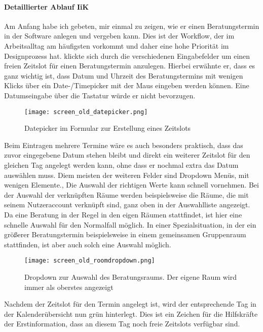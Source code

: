 \paragraph{Detaillierter Ablauf IiK}
Am Anfang habe ich \ipName gebeten, mir einmal zu zeigen, wie er einen
Beratungstermin in der Software anlegen und vergeben kann. Dies ist der
Workflow, der im Arbeitsalltag am häufigsten vorkommt und daher eine hohe
Priorität im Designprozess hat. \ipName klickte sich durch die verschiedenen
Eingabefelder um einen freien Zeitslot für einen Beratungstermin anzulegen.
Hierbei erwähnte er, dass es ganz wichtig ist, dass Datum und Uhrzeit des
Beratungstermins mit wenigen Klicks über ein Date-/Timepicker mit der Maus
eingeben werden können. Eine Datumseingabe über die Tastatur würde er nicht
bevorzugen.

\begin{figure}[H]
    \caption{Datepicker im Formular zur Erstellung eines Zeitslots}
    \centering
    \texttt{[image: screen\_old\_datepicker.png]}
\end{figure}

Beim Eintragen mehrere Termine wäre es auch besonders praktisch, dass das zuvor
eingegebene Datum stehen bleibt und direkt ein weiterer Zeitslot für den
gleichen Tag angelegt werden kann, ohne dass er nochmal extra das Datum
auswählen muss. Diem meisten der weiteren Felder sind Dropdown Menüs, mit
wenigen Elemente., Die Auswahl der richtigen Werte kann \ipName schnell
vornehmen. Bei der Auswahl der verknüpften Räume werden beispielsweise die
Räume, die mit seinem Nutzeraccount verknüpft sind, ganz oben in der
Auswahlliste angezeigt. Da eine Beratung in der Regel in den eigen Räumen
stattfindet, ist hier eine schnelle Auswahl für den Normalfall möglich. In
einer Spezialsituation, in der ein größerer Beratungstermin beispielsweise in
einem gemeinsamen Gruppenraum stattfinden, ist aber auch solch eine Auswahl
möglich.

\begin{figure}[H]
    \caption{Dropdown zur Auswahl des Beratungsraums. Der eigene Raum wird immer als oberstes angezeigt}
    \centering
    \texttt{[image: screen\_old\_roomdropdown.png]}
\end{figure}

Nachdem der Zeitslot für den Termin angelegt ist, wird der entsprechende Tag in
der Kalenderübersicht nun grün hinterlegt. Dies ist ein Zeichen für die
Hilfskräfte der Erstinformation, dass an diesem Tag noch freie Zeitslots
verfügbar sind.

